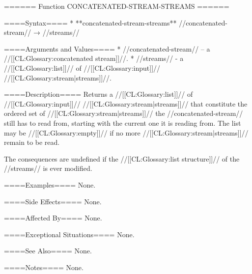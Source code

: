 ====== Function CONCATENATED-STREAM-STREAMS ======

====Syntax====
  * **concatenated-stream-streams** //concatenated-stream// → //streams//

====Arguments and Values====
  * //concatenated-stream// -- a //[[CL:Glossary:concatenated stream]]//.
  * //streams// - a //[[CL:Glossary:list]]// of //[[CL:Glossary:input]]// //[[CL:Glossary:stream|streams]]//.

====Description====
Returns a //[[CL:Glossary:list]]// of //[[CL:Glossary:input]]// //[[CL:Glossary:stream|streams]]// that constitute the ordered set of //[[CL:Glossary:stream|streams]]// the //concatenated-stream// still has to read from, starting with the current one it is reading from. The list may be //[[CL:Glossary:empty]]// if no more //[[CL:Glossary:stream|streams]]// remain to be read.

The consequences are undefined if the //[[CL:Glossary:list structure]]// of the //streams// is ever modified.

====Examples====
None.

====Side Effects====
None.

====Affected By====
None.

====Exceptional Situations====
None.

====See Also====
None.

====Notes====
None.

